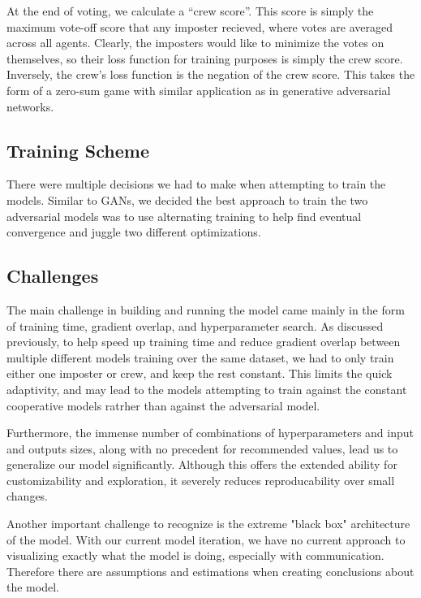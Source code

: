 \documentclass[10pt,twocolumn,letterpaper]{article}
\begin{document}
At the end of voting, we calculate a ``crew score''. This score is simply the
maximum vote-off score that any imposter recieved, where votes
are averaged across all agents. Clearly, the imposters would like to minimize the
votes on themselves, so their loss function for training purposes is
simply the crew score. Inversely, the crew's loss function is the negation of
the crew score. This takes the form of a zero-sum game with similar application
as in generative adversarial networks.
\subsection{Training Scheme}
There were multiple decisions we had to make when attempting to train the models.
Similar to GANs, we decided the best approach to train the two adversarial models was to
use alternating training to help find eventual convergence and juggle two different
optimizations.

\subsection{Challenges}
The main challenge in building and running the model
came mainly in the form of training time, gradient overlap, 
and hyperparameter search. As discussed previously, to help speed up training time
and reduce gradient overlap between multiple different models training over the
same dataset, we had to only train either one imposter or crew, and keep the rest constant.
This limits the quick adaptivity, and may lead to the models attempting to train
against the constant cooperative models ratrher than against the adversarial model.

Furthermore, the immense number of combinations of hyperparameters
and input and outputs sizes, along with no precedent for recommended values,
lead us to generalize our model significantly. Although this offers the extended ability for
customizability and exploration, it severely reduces reproducability over small changes. 

Another important challenge to recognize is the extreme "black box" architecture
of the model. With our current model iteration, we have no current approach to visualizing
exactly what the model is doing, especially with communication. Therefore there are
assumptions and estimations when creating conclusions about the model.
\end{document}
